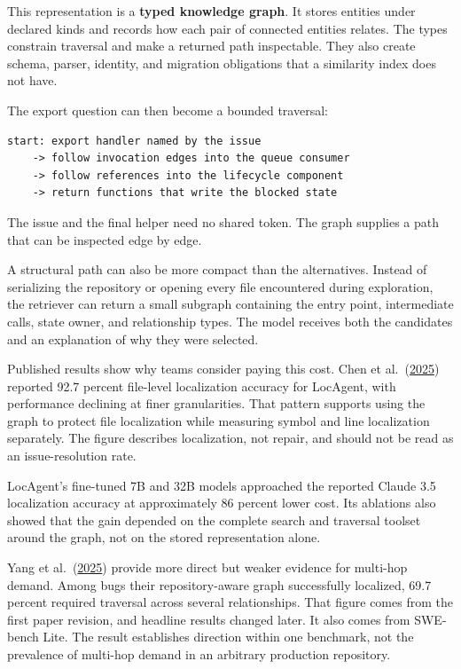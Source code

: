 This representation is a \textbf{typed knowledge graph}. It stores entities under declared kinds and records how each pair of connected entities relates. The types constrain traversal and make a returned path inspectable. They also create schema, parser, identity, and migration obligations that a similarity index does not have.

The export question can then become a bounded traversal:

\begin{verbatim}
start: export handler named by the issue
    -> follow invocation edges into the queue consumer
    -> follow references into the lifecycle component
    -> return functions that write the blocked state
\end{verbatim}

The issue and the final helper need no shared token. The graph supplies a path that can be inspected edge by edge.

A structural path can also be more compact than the alternatives. Instead of serializing the repository or opening every file encountered during exploration, the retriever can return a small subgraph containing the entry point, intermediate calls, state owner, and relationship types. The model receives both the candidates and an explanation of why they were selected.

Published results show why teams consider paying this cost. Chen et al.~(\href{https://arxiv.org/abs/2503.09089}{2025}) reported 92.7 percent file-level localization accuracy for LocAgent, with performance declining at finer granularities. That pattern supports using the graph to protect file localization while measuring symbol and line localization separately. The figure describes localization, not repair, and should not be read as an issue-resolution rate.

LocAgent's fine-tuned 7B and 32B models approached the reported Claude 3.5 localization accuracy at approximately 86 percent lower cost. Its ablations also showed that the gain depended on the complete search and traversal toolset around the graph, not on the stored representation alone.

Yang et al.~(\href{https://arxiv.org/abs/2503.21710v1}{2025}) provide more direct but weaker evidence for multi-hop demand. Among bugs their repository-aware graph successfully localized, 69.7 percent required traversal across several relationships. That figure comes from the first paper revision, and headline results changed later. It also comes from SWE-bench Lite. The result establishes direction within one benchmark, not the prevalence of multi-hop demand in an arbitrary production repository.

